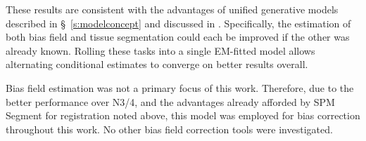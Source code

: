 These results are consistent with the advantages of unified generative models described in \S\ \ref{s:modelconcept} and discussed in  \cite{Ashburner2005}.
Specifically, the estimation of both bias field and tissue segmentation could each be improved if the other was already known.
Rolling these tasks into a single EM-fitted model allows alternating conditional estimates to converge on better results overall.
\par
Bias field estimation was not a primary focus of this work.
Therefore, due to the better performance over N3/4, and the advantages already afforded by SPM Segment for registration noted above, this model was employed for bias correction throughout this work.
No other bias field correction tools were investigated.
